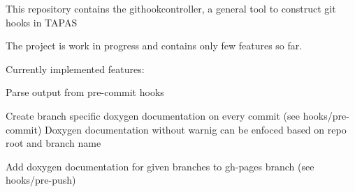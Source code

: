 This repository contains the githookcontroller, a general tool to construct git hooks in T\-A\-P\-A\-S

The project is work in progress and contains only few features so far.

Currently implemented features\-:
\begin{DoxyItemize}
\item Parse output from pre-\/commit hooks
\item Create branch specific doxygen documentation on every commit (see hooks/pre-\/commit) Doxygen documentation without warnig can be enfoced based on repo root and branch name
\item Add doxygen documentation for given branches to gh-\/pages branch (see hooks/pre-\/push) 
\end{DoxyItemize}